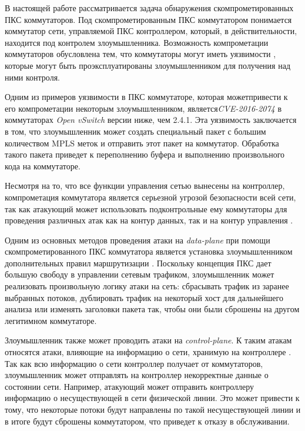 \documentclass[../thesis.tex]{subfiles}
\begin{document}
В настоящей работе рассматривается задача обнаружения скомпрометированных ПКС коммутаторов.
Под скомпрометированным ПКС коммутатором понимается коммутатор сети, управляемой ПКС контроллером, который, в действительности, находится под контролем злоумышленника.
Возможность компрометации коммутаторов обусловлена тем, что коммутаторы могут иметь уязвимости \cite{garcia2014analysis, myerson2002identifying, skaggs2002network}, которые могут быть проэксплуатированы злоумышленником для получения над ними контроля.

Одним из примеров уязвимости в ПКС коммутаторе, которая может\linebreak привести к его компрометации некоторым злоумышленником, является\linebreak \textit{CVE-2016-2074} \cite{thimmaraju2016reins} в коммутаторах \textit{Open vSwitch} \cite{pfaff2015design} версии ниже, чем 2.4.1.
Эта уязвимость заключается в том, что злоумышленник может создать специальный пакет с большим количеством MPLS \cite{davie2000mpls} меток и отправить этот пакет на коммутатор.
Обработка такого пакета приведет к переполнению буфера и выполнению произвольного кода на коммутаторе.

Несмотря на то, что все функции управления сетью вынесены на контроллер, компрометация коммутатора является серьезной угрозой безопасности всей сети, так как атакующий может использовать подконтрольные ему коммутаторы для проведения различных атак как на контур данных, так и на контур управления \cite{neti2012software}.

Одним из основных методов проведения атаки на \textit{data-plane} при помощи скомпрометированного ПКС коммутатора является установка злоумышленником дополнительных правил маршрутизации \cite{pang2016fade}.
Поскольку концепция ПКС дает большую свободу в управлении сетевым трафиком, злоумышленник может реализовать произвольную логику атаки на сеть: сбрасывать трафик из заранее выбранных потоков, дублировать трафик на некоторый хост для дальнейшего анализа или изменять заголовки пакета так, чтобы они были сброшены на другом легитимном коммутаторе.

Злоумышленник также может проводить атаки на \textit{control-plane}.
К таким атакам относятся атаки, влияющие на информацию о сети, хранимую на контроллере \cite{hong2015poisoning}.
Так как всю информацию о сети контроллер получает от коммутаторов, злоумышленник может отправлять на контроллер некорректные данные о состоянии сети.
Например, атакующий может отправить контроллеру информацию о несуществующей в сети физической линии.
Это может привести к тому, что некоторые потоки будут направлены по такой несуществующей линии и в итоге будут сброшены коммутатором, что приведет к отказу в обслуживании.
\\
\end{document}
